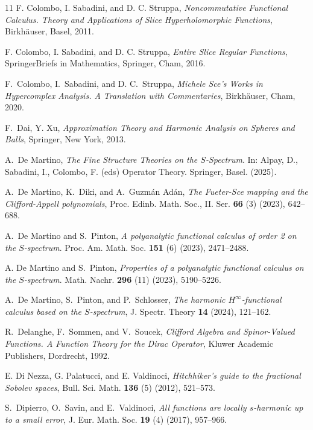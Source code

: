\documentclass[reqno,11pt]{amsart}
\theoremstyle{definition}
\begin{document}
\begin{thebibliography}{11}
F. Colombo, I. Sabadini, and D. C. Struppa,
\textit{Noncommutative Functional Calculus. Theory and Applications of Slice Hyperholomorphic Functions}, Birkh\"auser, Basel, 2011.

F. Colombo, I. Sabadini, and D. C. Struppa,
\textit{Entire Slice Regular Functions}, SpringerBriefs in Mathematics, Springer, Cham, 2016.
	
F.~Colombo, I.~Sabadini, and D. C.~Struppa,
\emph{Michele Sce's Works in Hypercomplex Analysis. A Translation with Commentaries},
Birkh\"auser, Cham, 2020.


 F.~Dai, Y. Xu, \emph{Approximation Theory and Harmonic Analysis on Spheres and Balls}, Springer, New York, 2013.


 A.~De Martino, \emph{The Fine Structure Theories on the $S$-Spectrum}. In: Alpay, D., Sabadini, I., Colombo, F. (eds) Operator Theory. Springer, Basel. (2025).




A.~De Martino, K.~Diki, and A.~Guzm\'an Ad\'an,
\textit{The Fueter-Sce mapping and the Clifford-Appell polynomials},
Proc. Edinb. Math. Soc., II. Ser. \textbf{66} (3) (2023), 642--688.


A.~De Martino and S.~Pinton,
\textit{A polyanalytic functional calculus of order 2 on the $S$-spectrum}.
Proc. Am. Math. Soc. \textbf{151} (6) (2023), 2471--2488.


A. De Martino and S.~Pinton,
\textit{Properties of a polyanalytic functional calculus on the $S$-spectrum}.
Math. Nachr. \textbf{296} (11) (2023), 5190--5226.


A.~De Martino, S.~Pinton, and P.~Schlosser,
\textit{The harmonic $H^\infty$-functional calculus  based on the $S$-spectrum},
J. Spectr. Theory \textbf{14} (2024), 121--162.


R.~Delanghe, F.~Sommen, and V.~Soucek,
\textit{Clifford Algebra and Spinor-Valued Functions. A Function Theory for the Dirac Operator}, Kluwer Academic Publishers, Dordrecht, 1992.




E. Di Nezza, G. Palatucci, and E. Valdinoci,
\textit{Hitchhiker's guide to the fractional {Sobolev} spaces},
Bull. Sci. Math. \textbf{136} (5) (2012), 521--573.

S.~Dipierro, O.~Savin, and E.~Valdinoci,
\textit{All functions are locally $s$-harmonic up to a small error},
J. Eur. Math. Soc. \textbf{19} (4) (2017), 957--966.




\end{thebibliography}
\end{document}
